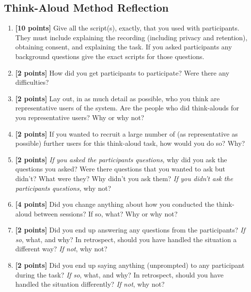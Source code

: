 \documentclass{article}
\begin{document}
\subsection{Think-Aloud Method Reflection}
\begin{enumerate}
    \item \textbf{[10 points]} Give all the script(s), exactly, that you used with participants. They must include explaining the recording (including privacy and retention), obtaining consent, and explaining the task. If you asked participants any background questions give the exact scripts for those questions.
    
    \item \textbf{[2 points]} How did you get participants to participate? Were there any difficulties?
    
    \item \textbf{[2 points]} Lay out, in as much detail as possible, who you think are representative users of the system. Are the people who did think-alouds for you representative users? Why or why not?
    
    \item \textbf{[2 points]} If you wanted to recruit a large number of (as representative as possible) further users for this think-aloud task, how would you do so? Why?
    
    \item \textbf{[2 points]} \textit{If you asked the participants questions,} why did you ask the questions you asked? Were there questions that you wanted to ask but didn't? What were they? Why didn't you ask them? \textit{If you didn't ask the participants questions,} why not?
    
    \item \textbf{[4 points]} Did you change anything about how you conducted the think-aloud between sessions? If so, what? Why or why not?
    
    \item \textbf{[2 points]} Did you end up answering any questions from the participants? \textit{If so}, what, and why? In retrospect, should you have handled the situation a different way? \textit{If not}, why not?
    
    \item \textbf{[2 points]} Did you end up saying anything (unprompted) to any participant during the task? \textit{If so}, what, and why? In retrospect, should you have handled the situation differently? \textit{If not}, why not?


\end{enumerate}
\end{document}
